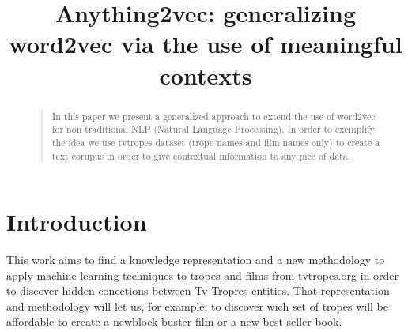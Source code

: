 \documentclass[letterpaper]{article}
\title{Anything2vec: generalizing word2vec via the use of meaningful
  contexts}
\begin{document}
 
\maketitle
\begin{abstract}
  \begin{quote}
In this paper we present a generalized approach to extend the use of word2vec for non traditional NLP (Natural Language Processing). In order to exemplify the idea we use tvtropes dataset (trope names and film names only) to create a text corupus in order to give contextual information to any pice of data.
\end{quote}
\end{abstract}





\section{Introduction}


This work aims to find a knowledge representation and a new methodology to apply machine learning techniques to tropes and films from tvtropes.org in order to discover hidden conections between Tv Tropres entities. That representation and methodology will let us, for example, to discover wich set of tropes will be affordable to create a newblock buster film or a new best seller book. %
\end{document}
